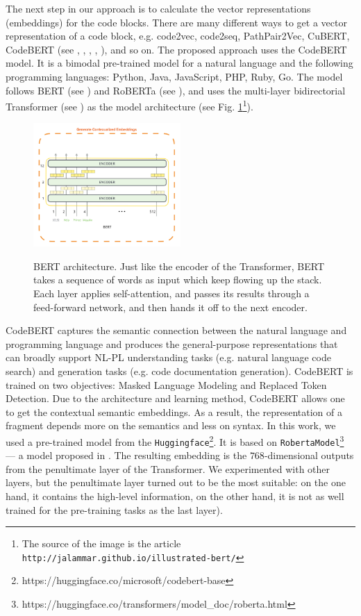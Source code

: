 \documentclass[conference]{ieeetran}
\begin{document}
The next step in our approach is to calculate the vector representations (embeddings) for the code blocks.
There are many different ways to get a vector representation of a code block,
 e.g.  code2vec, code2seq, PathPair2Vec, CuBERT, CodeBERT
 (see \cite{AlonEtAl2019vec}, \cite{AlonEtAl2019seq},  \cite{ShiEtAl2020}, \cite{KanadeEtAl2020}, \cite{FengEtAl2020}), and so on.
The proposed approach uses the CodeBERT model.
It is a bimodal pre-trained model for a  natural language and the following programming languages:
  Python, Java, JavaScript, PHP, Ruby, Go.
The model follows BERT (see \cite{DevlinEtAl2019}) and RoBERTa (see \cite{LiuEtAl2019}),
 and uses the multi-layer bidirectorial Transformer (see \cite{VaswaniEtAl2017}) as the model architecture
 (see Fig. \ref{bert_arch}\footnote{The source of the image is the article \texttt{http://jalammar.github.io/illustrated-bert/}}).
\begin{figure}[htbp]
\caption{BERT architecture.
Just like the encoder of the Transformer,
 BERT takes a sequence of words as input which keep flowing up the stack.
 Each layer applies self-attention, and passes its results through a feed-forward network, and then hands it off to the next encoder.}
\centering
\includegraphics[width=0.5\textwidth]{bert_arch}
\label{bert_arch}
\end{figure}
CodeBERT captures the semantic connection between the natural language and programming language
 and produces the general-purpose representations that can broadly support NL-PL understanding tasks
 (e.g. natural language code search) and generation tasks (e.g. code documentation generation).
CodeBERT is trained on two objectives: Masked Language Modeling and Replaced Token Detection.
Due to the architecture and learning method, CodeBERT allows one to get the contextual semantic embeddings.
As a result, the representation of a fragment depends more on the semantics and less on syntax.
In this work, we used a pre-trained model from the \texttt{Huggingface}\footnote{https://huggingface.co/microsoft/codebert-base}.
It is based on \texttt{RobertaModel}\footnote{https://huggingface.co/transformers/model\_doc/roberta.html} --- a model proposed in \cite{LiuEtAl2019}.
The resulting embedding is the $768$-dimensional outputs from the penultimate layer of the Transformer.
We experimented with other layers, but the penultimate layer turned out to be the most suitable:
 on the one hand, it contains the high-level information,
 on the other hand, it is not as well trained for the pre-training tasks as the last layer). 
\end{document}
